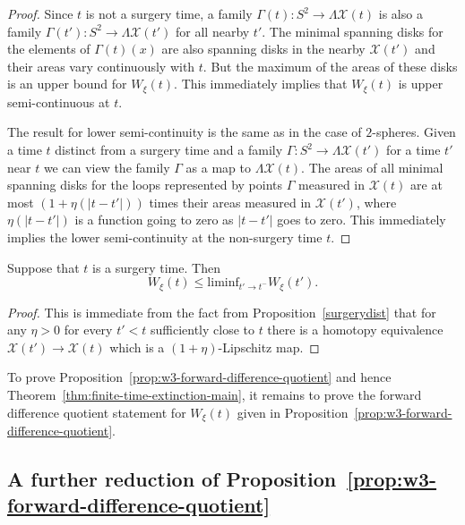 \begin{proof}
Since $t$ is not a surgery time, a family $\Gamma(t)\colon S^2\to
\Lambda {\mathcal X}(t)$ is also a family $\Gamma(t')\colon
S^2\to\Lambda{\mathcal X}(t')$ for all nearby $t'$. The minimal
spanning disks for the elements of $\Gamma(t)(x)$ are  also spanning
disks in the nearby ${\mathcal X}(t')$ and their areas vary
continuously with $t$. But the maximum of the areas of these disks
is an upper bound for $W_\xi(t)$. This immediately implies that
$W_\xi(t)$ is upper semi-continuous at $t$.

The result for lower semi-continuity is the same as in the case of
$2$-spheres. Given a time $t$ distinct from a surgery time and a
family $\Gamma\colon S^2\to \Lambda {\mathcal X}(t')$ for a time
$t'$ near $t$ we can view the family $\Gamma$ as a map to $\Lambda
{\mathcal X}(t)$. The areas of all minimal spanning disks for the
loops represented by points $\Gamma$ measured in ${\mathcal X}(t)$
are at most $(1+\eta(|t-t'|))$ times their areas measured in
${\mathcal X}(t')$, where $\eta(|t-t'|)$ is a function going to zero
as $|t-t'|$ goes to zero. This immediately implies the lower
semi-continuity at the non-surgery time $t$.
\end{proof}


\begin{claim}
\label{claim:w-xi-surgery-semicontinuity}
Suppose that $t$ is a surgery time. Then
$$W_\xi(t)\le \mathrm{liminf}_{t'\rightarrow t^-}W_\xi(t').$$
\end{claim}

\begin{proof}
This is immediate from the fact from Proposition~\ref{surgerydist} that for any
$\eta>0$ for every $t'<t$ sufficiently close to $t$ there is a homotopy
equivalence ${\mathcal X}(t')\to {\mathcal X}(t)$ which is a
$(1+\eta)$-Lipschitz map.
\end{proof}

To prove Proposition~\ref{prop:w3-forward-difference-quotient} and hence
Theorem~\ref{thm:finite-time-extinction-main}, it remains to prove the forward difference
quotient statement for $W_\xi(t)$ given in
Proposition~\ref{prop:w3-forward-difference-quotient}.






\subsection{A further reduction of
Proposition~{\ref{prop:w3-forward-difference-quotient}}}

